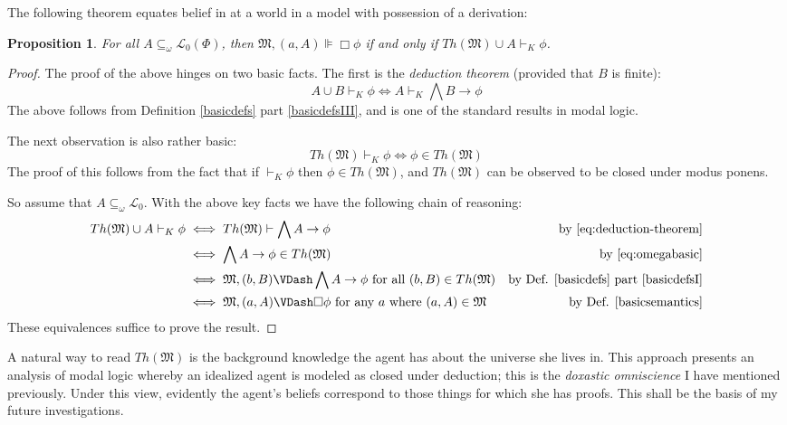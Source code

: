 \documentclass[11pt]{article}
\numberwithin{equation}{subsection}
\newtheorem{prop}[theorem]{Proposition}
\renewcommand{\Omega}{\mathfrak{M}}
\begin{document}
The following theorem equates belief in at a world in a model with
possession of a derivation:
\begin{prop}\label{central-prop}
 For all $A\subseteq_\omega \mathcal{L}_0(\Phi)$, then $\Omega, (a,A) \VDash \Box \phi$ if and only if $Th(\Omega) \cup A \vdash_K \phi$.
\end{prop}
\begin{proof}
The proof of the above hinges on two basic facts.  The first is the
\emph{deduction theorem} (provided that $B$ is finite):
\begin{equation}
A \cup B \vdash_K \phi \iff A \vdash_K \bigwedge B \to \phi \label{eq:deduction-theorem}
\end{equation}
The above follows from Definition
\ref{basicdefs} part \ref{basicdefsIII}, and is one of the standard results in
modal logic.

The next observation is also rather basic:
\begin{equation}
Th(\Omega) \vdash_K \phi \iff \phi \in Th(\Omega) \label{eq:omegabasic}
\end{equation}
The proof of this follows from the fact that if $\vdash_K \phi$ then
$\phi \in Th(\Omega)$, and $Th(\Omega)$ can be observed to be  closed under modus ponens.

So assume that $A \subseteq_\omega
\mathcal{L}_0$. With the above key facts we have the following chain
of reasoning:
\begin{align*}
  Th(\Omega) \cup A \vdash_K \phi & \iff   Th(\Omega) \vdash \bigwedge A
  \to \phi 
   & \textup{by \eqref{eq:deduction-theorem}} 
\\
 & \iff \bigwedge A \to \phi \in Th(\Omega) & \textup{by
   \eqref{eq:omegabasic}} \\
 & \iff \Omega, (b,B) \VDash \bigwedge A \to \phi \textup{ for all
   $(b,B) \in Th(\Omega)$} & \textup{by Def. \ref{basicdefs} part
   \ref{basicdefsI}} \\
 & \iff \Omega,(a,A) \VDash \Box \phi \textup{ for any $a$ where
   $(a,A) \in \Omega$} & \textup{by Def. \ref{basicsemantics}}
\end{align*}
These equivalences suffice to prove the result.
\end{proof}

A natural way to read $Th(\Omega)$ is the background knowledge the agent has about the universe she lives in.  This approach presents an analysis of modal logic whereby an idealized agent is modeled as closed under deduction; this is the \emph{doxastic omniscience} I have mentioned previously. Under this view, evidently the agent's beliefs correspond to those things for which she has proofs.  This shall be the basis of my future investigations.
\end{document}
